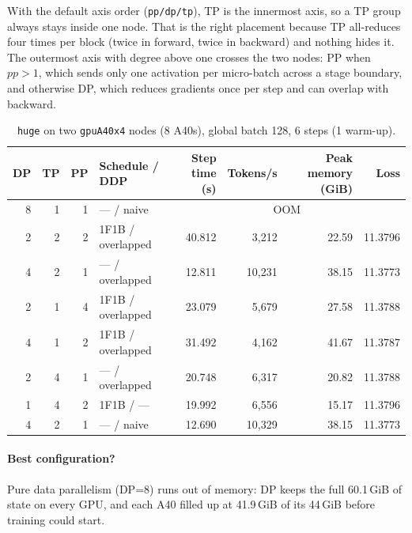 \documentclass[10pt]{article}
\begin{document}
With the default axis order (\texttt{pp/dp/tp}), TP is the innermost axis,
so a TP group always stays inside one node. That is the right placement
because TP all-reduces four times per block (twice in forward, twice in
backward) and nothing hides it. The outermost axis with degree above one
crosses the two nodes: PP when $pp>1$, which sends only one activation per
micro-batch across a stage boundary, and otherwise DP, which reduces
gradients once per step and can overlap with backward.

\begin{table}[htbp]
\caption{\texttt{huge} on two \texttt{gpuA40x4} nodes (8 A40s), global
batch 128, 6 steps (1 warm-up).}
\label{tab:part4}
\centering
\begin{tabular}{rrrlrrrr}
\toprule
DP & TP & PP & Schedule / DDP & Step time (s) & Tokens/s & Peak memory (GiB) & Loss \\
\midrule
8 & 1 & 1 & --- / naive        & \multicolumn{4}{c}{OOM} \\
2 & 2 & 2 & 1F1B / overlapped  & 40.812 & 3{,}212  & 22.59 & 11.3796 \\
4 & 2 & 1 & --- / overlapped   & 12.811 & 10{,}231 & 38.15 & 11.3773 \\
2 & 1 & 4 & 1F1B / overlapped  & 23.079 & 5{,}679  & 27.58 & 11.3788 \\
4 & 1 & 2 & 1F1B / overlapped  & 31.492 & 4{,}162  & 41.67 & 11.3787 \\
2 & 4 & 1 & --- / overlapped   & 20.748 & 6{,}317  & 20.82 & 11.3788 \\
1 & 4 & 2 & 1F1B / ---         & 19.992 & 6{,}556  & 15.17 & 11.3796 \\
4 & 2 & 1 & --- / naive        & 12.690 & 10{,}329 & 38.15 & 11.3773 \\
\bottomrule
\end{tabular}
\end{table}

\paragraph{Best configuration?}
Pure data parallelism (DP=8) runs out of memory: DP keeps the full
60.1\,GiB of state on every GPU, and each A40 filled up at 41.9\,GiB of its
44\,GiB before training could start.
\end{document}
